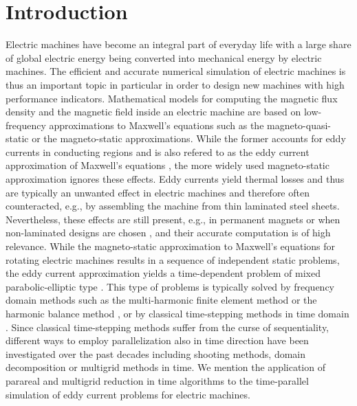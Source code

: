 \documentclass[12pt]{article}
\numberwithin{equation}{section}
\begin{document}
\section{Introduction}\label{sec:intro}
Electric machines have become an integral part of everyday life with a
large share of global electric energy being converted into mechanical energy
by electric machines. The efficient and accurate numerical simulation of
electric machines is thus an important topic in particular in order to design
new machines with high performance indicators. Mathematical models for
computing the magnetic flux density and the magnetic field inside an
electric machine are based on low-frequency approximations to Maxwell's
equations such as the magneto-quasi-static or the magneto-static
approximations. While the former accounts for eddy currents in conducting
regions and is also refered to as the eddy current approximation of
Maxwell's equations \cite{Rodrguez2010}, the more widely used magneto-static
approximation ignores these effects. Eddy currents yield thermal losses
\cite{Ida1997} and thus are typically an unwanted effect in electric machines
and therefore often counteracted, e.g., by assembling the machine from thin
laminated steel sheets. Nevertheless, these effects are still present, e.g.,
in permanent magnets or when non-laminated designs are chosen
\cite{Mellak2022}, and their accurate computation is of high relevance.
While the magneto-static approximation to Maxwell's equations for rotating
electric machines results in a sequence of independent static problems, the
eddy current approximation yields a time-dependent problem of mixed
parabolic-elliptic type \cite{Bachinger2005}. This type of problems is
typically solved by frequency domain methods such as the multi-harmonic
finite element method \cite{wolfmayr2023posteriori} or the harmonic
balance method \cite{GyselinckEtAl2003, Putek2019}, or by classical
time-stepping methods in time domain \cite{Thomee2006}.
Since classical time-stepping methods suffer from the curse of sequentiality,
different ways to employ parallelization also in time direction have been
investigated over the past decades \cite{Gander2015} including shooting
methods, domain decomposition or multigrid methods
\cite{GanderNeumueller2016} in time. We mention the application of
parareal \cite{GanderKuchytska2019, Kulchytska2021} and multigrid reduction
in time \cite{Bolten2020, Friedhoff2019} algorithms to the time-parallel
simulation of eddy current problems for electric machines.
\end{document}
